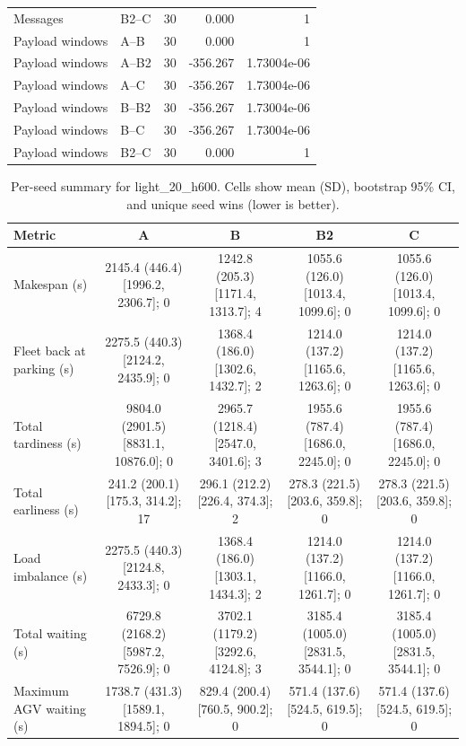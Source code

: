\begin{table}[t]
\begin{tabular}{llrrr}
Messages & B2--C & 30 & 0.000 & 1 \\
Payload windows & A--B & 30 & 0.000 & 1 \\
Payload windows & A--B2 & 30 & -356.267 & 1.73004e-06 \\
Payload windows & A--C & 30 & -356.267 & 1.73004e-06 \\
Payload windows & B--B2 & 30 & -356.267 & 1.73004e-06 \\
Payload windows & B--C & 30 & -356.267 & 1.73004e-06 \\
Payload windows & B2--C & 30 & 0.000 & 1 \\
\bottomrule
\end{tabular}
\end{table}

\begin{table}[t]
\centering
\caption{Per-seed summary for light\_20\_h600. Cells show mean (SD), bootstrap 95\% CI, and unique seed wins (lower is better).}
\label{tab:light-20-h600}
\begin{tabular}{lcccc}
\toprule
Metric & A & B & B2 & C \\
\midrule
Makespan (s) & 2145.4 (446.4) [1996.2, 2306.7]; 0 & 1242.8 (205.3) [1171.4, 1313.7]; 4 & 1055.6 (126.0) [1013.4, 1099.6]; 0 & 1055.6 (126.0) [1013.4, 1099.6]; 0 \\
Fleet back at parking (s) & 2275.5 (440.3) [2124.2, 2435.9]; 0 & 1368.4 (186.0) [1302.6, 1432.7]; 2 & 1214.0 (137.2) [1165.6, 1263.6]; 0 & 1214.0 (137.2) [1165.6, 1263.6]; 0 \\
Total tardiness (s) & 9804.0 (2901.5) [8831.1, 10876.0]; 0 & 2965.7 (1218.4) [2547.0, 3401.6]; 3 & 1955.6 (787.4) [1686.0, 2245.0]; 0 & 1955.6 (787.4) [1686.0, 2245.0]; 0 \\
Total earliness (s) & 241.2 (200.1) [175.3, 314.2]; 17 & 296.1 (212.2) [226.4, 374.3]; 2 & 278.3 (221.5) [203.6, 359.8]; 0 & 278.3 (221.5) [203.6, 359.8]; 0 \\
Load imbalance (s) & 2275.5 (440.3) [2124.8, 2433.3]; 0 & 1368.4 (186.0) [1303.1, 1434.3]; 2 & 1214.0 (137.2) [1166.0, 1261.7]; 0 & 1214.0 (137.2) [1166.0, 1261.7]; 0 \\
Total waiting (s) & 6729.8 (2168.2) [5987.2, 7526.9]; 0 & 3702.1 (1179.2) [3292.6, 4124.8]; 3 & 3185.4 (1005.0) [2831.5, 3544.1]; 0 & 3185.4 (1005.0) [2831.5, 3544.1]; 0 \\
Maximum AGV waiting (s) & 1738.7 (431.3) [1589.1, 1894.5]; 0 & 829.4 (200.4) [760.5, 900.2]; 0 & 571.4 (137.6) [524.5, 619.5]; 0 & 571.4 (137.6) [524.5, 619.5]; 0 \\

\end{tabular}
\end{table}
